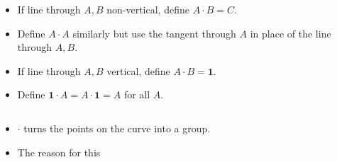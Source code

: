 \begin{frame}[fragile]
\begin{columns}
	\begin{definition}
		\begin{itemize}
			\item If line through $A,B$ non-vertical, define $A\cdot B = C$.
			\item Define $A\cdot A$ similarly but use the tangent through $A$ in place of the line through $A, B$.
			\item If line through $A,B$ vertical, define $A\cdot B= \mathbf 1$.
			\item Define $\mathbf 1\cdot A = A\cdot \mathbf 1 = A$ for all $ A$.
		\end{itemize}
	\end{definition}
\end{columns}
\begin{itemize}
	\item $\cdot$ turns the points on the curve into a group.
	\item The reason for this
\end{itemize}



\vskip 10cm

\end{frame}